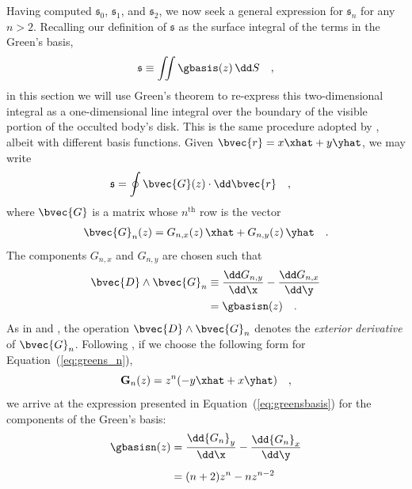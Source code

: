 \documentclass[modern,trackchanges]{aastex63}
\begin{document}

Having computed $\mathfrak{s}_0$, $\mathfrak{s}_1$, and $\mathfrak{s}_2$,
we now seek a general expression for $\mathfrak{s}_n$ for any $n > 2$.
Recalling our definition of $\mathfrak{s}$ as the surface integral of
the terms in the Green's basis,
%
\begin{align}
    \mathfrak{s} \equiv \iint \gbasis (z) \, \dd S \quad,
\end{align}
%
in this section we will use Green's theorem to re-express this two-dimensional
integral as a one-dimensional line integral over the boundary of the visible
portion of the occulted body's disk. This is the same procedure adopted by
\citet{starry}, albeit with different basis functions.
Given $\bvec{r} = x \xhat + y \yhat$, we may write
%
%
\begin{align}
    \label{eq:greens}
    \mathfrak{s} &=
    \oint \bvec{G} (z) \cdot \dd \bvec{r}
    \quad,
\end{align}
%
where $\bvec{G}$ is a matrix whose $n^{\mathrm{th}}$ row is the
vector
%
\begin{align}
    \label{eq:greens_n}
    \bvec{G}_n (z) = G_{n,x} (z) \, \xhat + G_{n,y} (z) \, \yhat \quad .
\end{align}
%
The components $G_{n,x}$ and $G_{n,y}$ are chosen such that
%
\begin{align}
    \label{eq:DGg}
    \bvec{D} \wedge \bvec{G}_n &\equiv \frac{\dd G_{n,y}}{\dd \x}
                                     - \frac{\dd G_{n,x}}{\dd \y} \nonumber \\
                               &= \gbasisn(z) \quad.
\end{align}
%
As in \citet{Pal2012} and \citet{starry}, the operation
$\bvec{D} \wedge \bvec{G}_n$ denotes the
\emph{exterior derivative} of $\bvec{G}_n$.
%
%
%
Following \citet{starry},
if we choose the following form for
Equation~(\ref{eq:greens_n}),
%
\begin{equation}
\mathbf{G}_n(z) = z^n (-y \xhat + x \yhat) \quad,
\end{equation}
%
we arrive at the expression presented in Equation~(\ref{eq:greensbasis})
for the components of the Green's basis:
%
\begin{align}
\gbasisn(z)   &= \frac{\dd {G_n}_y}{\dd \x} - \frac{\dd {G_n}_x}{\dd \y} \nonumber \\[0.5em]
              &= (n+2)z^n-n z^{n-2}
\end{align}
\end{document}
